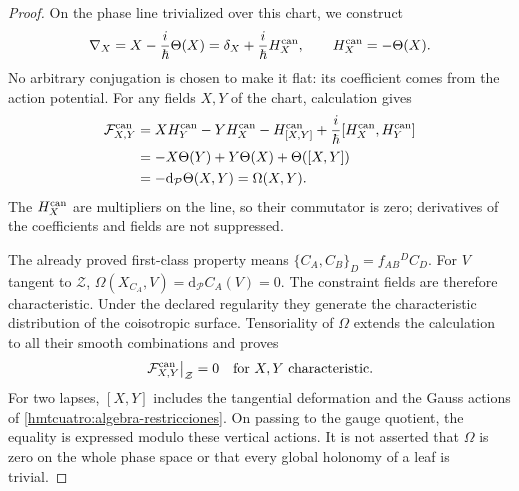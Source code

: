 \begin{proof}
On the phase line trivialized over this chart, we construct
\begin{equation}
 \nabla_X=X-\frac{i}{\hbar}\Theta(X)
       =\delta_X+\frac{i}{\hbar}H_X^{\rm can},
 \qquad H_X^{\rm can}=-\Theta(X).
 \label{hmtcuatro:conexion-canonica}
\end{equation}
No arbitrary conjugation is chosen to make it flat: its coefficient comes from the action potential. For any fields \(X,Y\) of the chart, calculation gives
\begin{equation}
 \begin{aligned}
 \mathcal F^{\rm can}_{X,Y}
 &=XH_Y^{\rm can}-YH_X^{\rm can}-H_{[X,Y]}^{\rm can}
       +\frac{i}{\hbar}[H_X^{\rm can},H_Y^{\rm can}]\\
 &=-X\Theta(Y)+Y\Theta(X)+\Theta([X,Y])\\
 &=-\mathrm d_{\mathcal P}\Theta(X,Y)=\Omega(X,Y).
 \end{aligned}
 \label{hmtcuatro:curvatura-calculada}
\end{equation}
The \(H_X^{\rm can}\) are multipliers on the line, so their commutator is zero; derivatives of the coefficients and fields are not suppressed.

The already proved first-class property means \(\{C_A,C_B\}_D=f_{AB}{}^D C_D\). For \(V\) tangent to \(\mathcal Z\), \(\Omega(X_{C_A},V)=\mathrm d_{\mathcal P}C_A(V)=0\). The constraint fields are therefore characteristic. Under the declared regularity they generate the characteristic distribution of the coisotropic surface. Tensoriality of \(\Omega\) extends the calculation to all their smooth combinations and proves
\begin{equation}
 \left.\mathcal F^{\rm can}_{X,Y}\right|_{\mathcal Z}=0
 \quad\hbox{for }X,Y\hbox{ characteristic}.
 \label{hmtcuatro:cierre-caracteristico}
\end{equation}
For two lapses, \([X,Y]\) includes the tangential deformation and the Gauss actions of \eqref{hmtcuatro:algebra-restricciones}. On passing to the gauge quotient, the equality is expressed modulo these vertical actions. It is not asserted that \(\Omega\) is zero on the whole phase space or that every global holonomy of a leaf is trivial.


\end{proof}
